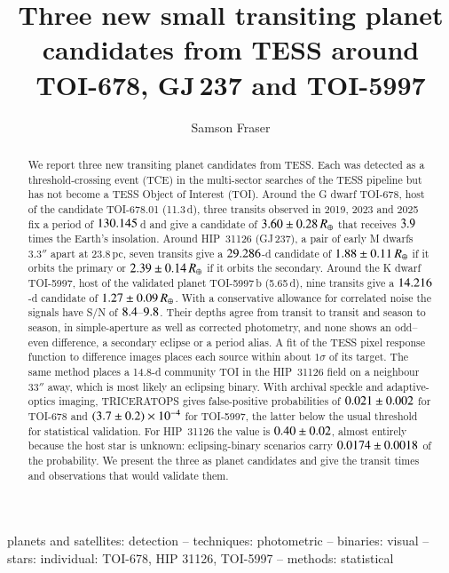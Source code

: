 \documentclass[twocolumn,numberedappendix,appendixfloats]{openjournal}
\newcommand{\rearth}{R_{\oplus}}
\begin{document}
\title{Three new small transiting planet candidates from TESS around
TOI-678, GJ\,237 and TOI-5997}

\author{Samson Fraser}

\begin{abstract}
We report three new transiting planet candidates from TESS. Each was detected as a
threshold-crossing event (TCE) in the multi-sector searches of the TESS pipeline
but has not become a TESS Object of Interest (TOI). Around the G dwarf TOI-678, host of the candidate
TOI-678.01 (11.3\,d), three transits observed in 2019, 2023 and 2025 fix a
period of $130.145$\,d and give a candidate of $\RpTs\,\rearth$ that receives
$3.9$ times the Earth's insolation. Around HIP~31126 (GJ\,237), a pair of early
M dwarfs $3.3''$ apart at 23.8\,pc, seven transits give a $29.286$-d
candidate of $\RpHp\,\rearth$ if it orbits the primary or $\RpHpB\,\rearth$ if
it orbits the secondary. Around the K dwarf TOI-5997, host of the validated
planet TOI-5997\,b (5.65\,d), nine transits give a $14.216$-d candidate of
$\RpTf\,\rearth$. With a conservative allowance for correlated noise the
signals have S/N of $8.4$--$9.8$. Their depths agree from transit
to transit and season to season, in simple-aperture as well as corrected
photometry, and none shows an odd--even difference, a secondary eclipse or a
period alias. A fit of the TESS pixel response function to difference images
places each source within about $1\sigma$ of its target. The same method places
a 14.8-d community TOI in the HIP~31126 field on a neighbour $33''$ away, which
is most likely an eclipsing binary. With archival speckle and adaptive-optics imaging, TRICERATOPS gives
false-positive probabilities of $0.021 \pm 0.002$ for TOI-678 and $(3.7 \pm 0.2)\times10^{-4}$ for
TOI-5997, the latter below the usual threshold for statistical validation. For HIP~31126 the value is $0.40 \pm 0.02$, almost entirely because the
host star is unknown: eclipsing-binary scenarios carry $0.0174 \pm 0.0018$ of the
probability. We present the three as planet candidates and give the transit
times and observations that would validate them.
\end{abstract}

\begin{keywords}
{planets and satellites: detection -- techniques: photometric -- binaries:
visual -- stars: individual: TOI-678, HIP 31126, TOI-5997 -- methods:
statistical}
\end{keywords}
\end{document}
